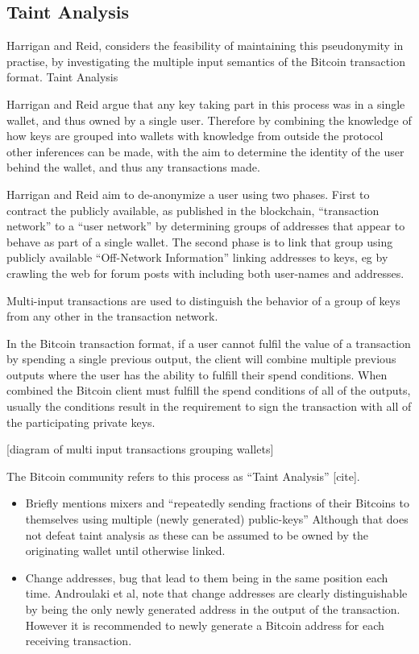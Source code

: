 \subsection{Taint Analysis} Harrigan and Reid, considers the feasibility of
maintaining this pseudonymity in practise, by investigating the multiple input
semantics of the Bitcoin transaction format.  Taint Analysis

Harrigan and Reid argue that any key taking part in this process was in a
single wallet, and thus owned by a single user. Therefore by combining the
knowledge of how keys are grouped into wallets with knowledge from outside the
protocol other inferences can be made, with the aim to determine the identity
of the user behind the wallet, and thus any transactions made.

Harrigan and Reid aim to de-anonymize a user using two phases.  First to
contract the publicly available, as published in the blockchain, “transaction
network” to a “user network” by determining groups of addresses that appear to
behave as part of a single wallet.  The second phase is to  link that group
using publicly available “Off-Network Information” linking addresses to keys,
eg by crawling the web for forum posts with including both user-names and
addresses.

Multi-input transactions are used to distinguish the behavior of a group of
keys from any other in the transaction network.

In the Bitcoin transaction format, if a user cannot fulfil the value of a
transaction by spending a single previous output, the client will combine
multiple previous outputs where the user has the ability to fulfill their spend
conditions.  When combined the Bitcoin client must fulfill the spend conditions
of all of the outputs, usually the conditions result in the requirement to sign
the transaction with all of the participating private keys.

[diagram of multi input transactions grouping wallets]

The Bitcoin community refers to this process as “Taint Analysis” [cite].

\begin{itemize} \item Briefly mentions mixers and “repeatedly sending fractions
of their Bitcoins to themselves using multiple (newly generated) public-keys”
Although that does not defeat taint analysis as these can be assumed to be
owned by the originating wallet until otherwise linked.  \item Change
addresses, bug that lead to them being in the same position each time.
Androulaki et al, note that change addresses are clearly distinguishable by
being the only newly generated address in the output of the transaction.
However it is recommended to newly generate a Bitcoin address for each
receiving transaction.  \end{itemize}

